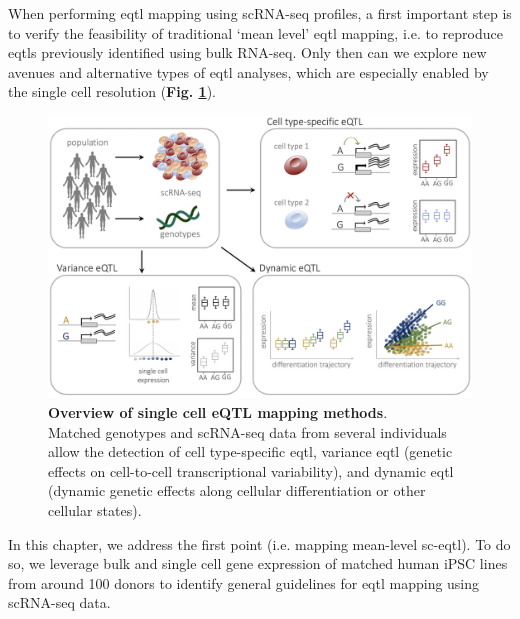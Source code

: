 When performing \gls{eqtl} mapping using scRNA-seq profiles, a first important step is to verify the feasibility of traditional `mean level' \gls{eqtl} mapping, i.e. to reproduce \glspl{eqtl} previously identified using bulk RNA-seq.
Only then can we explore new avenues and alternative types of \gls{eqtl} analyses, which are especially enabled by the single cell resolution (\textbf{Fig. \ref{fig:sc_eqtl}}).\\

\begin{figure}[h]
\centering
\includegraphics[width=14cm]{Chapter3/Fig/sc_eqtl.png}
\caption[Single cell eQTL]{\textbf{Overview of single cell eQTL mapping methods}.\\
Matched genotypes and scRNA-seq data from several individuals allow the detection of cell type-specific \gls{eqtl}, variance \gls{eqtl} (genetic effects on cell-to-cell transcriptional variability), and dynamic \gls{eqtl} (dynamic genetic effects along cellular differentiation or other cellular states).}
\label{fig:sc_eqtl}
\end{figure}

In this chapter, we address the first point (i.e. mapping mean-level sc-\gls{eqtl}).
To do so, we leverage bulk and single cell gene expression of matched human 
iPSC
lines from around 100 donors to identify general guidelines for \gls{eqtl} mapping using scRNA-seq data.

